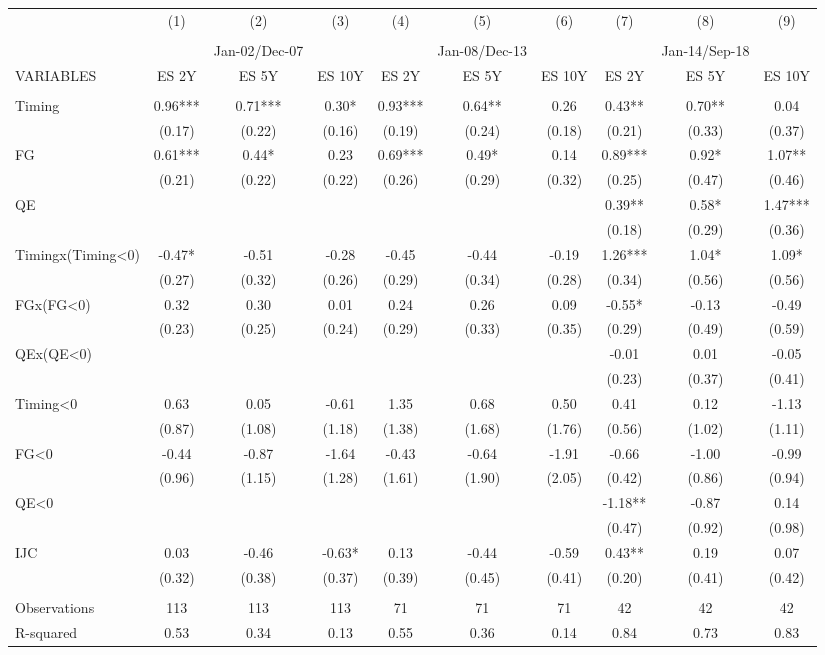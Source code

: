 \begin{tabular}{lccccccccc} \hline
 & (1) & (2) & (3) & (4) & (5) & (6) & (7) & (8) & (9) \\
 &  &  &  &  &  &  &  &  &  \\
 &  & Jan-02/Dec-07 &  &  & Jan-08/Dec-13 &  &  & Jan-14/Sep-18 &  \\
VARIABLES & ES 2Y & ES 5Y & ES 10Y & ES 2Y & ES 5Y & ES 10Y & ES 2Y & ES 5Y & ES 10Y \\ \hline
 &  &  &  &  &  &  &  &  &  \\
Timing & 0.96*** & 0.71*** & 0.30* & 0.93*** & 0.64** & 0.26 & 0.43** & 0.70** & 0.04 \\
 & (0.17) & (0.22) & (0.16) & (0.19) & (0.24) & (0.18) & (0.21) & (0.33) & (0.37) \\
FG & 0.61*** & 0.44* & 0.23 & 0.69*** & 0.49* & 0.14 & 0.89*** & 0.92* & 1.07** \\
 & (0.21) & (0.22) & (0.22) & (0.26) & (0.29) & (0.32) & (0.25) & (0.47) & (0.46) \\
QE &  &  &  &  &  &  & 0.39** & 0.58* & 1.47*** \\
 &  &  &  &  &  &  & (0.18) & (0.29) & (0.36) \\
Timingx(Timing<0) & -0.47* & -0.51 & -0.28 & -0.45 & -0.44 & -0.19 & 1.26*** & 1.04* & 1.09* \\
 & (0.27) & (0.32) & (0.26) & (0.29) & (0.34) & (0.28) & (0.34) & (0.56) & (0.56) \\
FGx(FG<0) & 0.32 & 0.30 & 0.01 & 0.24 & 0.26 & 0.09 & -0.55* & -0.13 & -0.49 \\
 & (0.23) & (0.25) & (0.24) & (0.29) & (0.33) & (0.35) & (0.29) & (0.49) & (0.59) \\
QEx(QE<0) &  &  &  &  &  &  & -0.01 & 0.01 & -0.05 \\
 &  &  &  &  &  &  & (0.23) & (0.37) & (0.41) \\
Timing<0 & 0.63 & 0.05 & -0.61 & 1.35 & 0.68 & 0.50 & 0.41 & 0.12 & -1.13 \\
 & (0.87) & (1.08) & (1.18) & (1.38) & (1.68) & (1.76) & (0.56) & (1.02) & (1.11) \\
FG<0 & -0.44 & -0.87 & -1.64 & -0.43 & -0.64 & -1.91 & -0.66 & -1.00 & -0.99 \\
 & (0.96) & (1.15) & (1.28) & (1.61) & (1.90) & (2.05) & (0.42) & (0.86) & (0.94) \\
QE<0 &  &  &  &  &  &  & -1.18** & -0.87 & 0.14 \\
 &  &  &  &  &  &  & (0.47) & (0.92) & (0.98) \\
IJC & 0.03 & -0.46 & -0.63* & 0.13 & -0.44 & -0.59 & 0.43** & 0.19 & 0.07 \\
 & (0.32) & (0.38) & (0.37) & (0.39) & (0.45) & (0.41) & (0.20) & (0.41) & (0.42) \\
 &  &  &  &  &  &  &  &  &  \\
Observations & 113 & 113 & 113 & 71 & 71 & 71 & 42 & 42 & 42 \\
 R-squared & 0.53 & 0.34 & 0.13 & 0.55 & 0.36 & 0.14 & 0.84 & 0.73 & 0.83 \\ \hline
\end{tabular}

